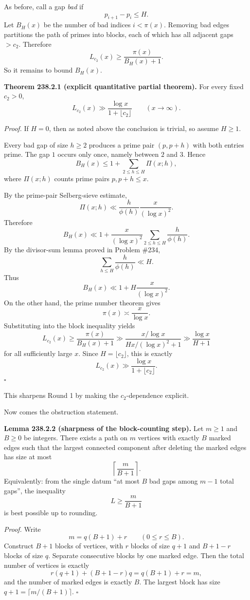 As before, call a gap \emph{bad} if
\[
p_{i+1}-p_i\le H.
\]
Let $B_H(x)$ be the number of bad indices $i<\pi(x)$. Removing bad edges partitions the path of primes into blocks, each of which has all adjacent gaps $>c_2$. Therefore
\[
L_{c_2}(x)\ge \frac{\pi(x)}{B_H(x)+1}.
\]
So it remains to bound $B_H(x)$.

\medskip
\noindent
\textbf{Theorem 238.2.1 (explicit quantitative partial theorem).}
For every fixed $c_2>0$,
\[
L_{c_2}(x)\gg \frac{\log x}{1+\lfloor c_2\rfloor}
\qquad (x\to\infty).
\]

\emph{Proof.}
If $H=0$, then as noted above the conclusion is trivial, so assume $H\ge 1$.

Every bad gap of size $h\ge 2$ produces a prime pair $(p,p+h)$ with both entries prime. The gap $1$ occurs only once, namely between $2$ and $3$. Hence
\[
B_H(x)
\le
1+\sum_{2\le h\le H}\Pi(x;h),
\]
where $\Pi(x;h)$ counts prime pairs $p,p+h\le x$.

By the prime-pair Selberg-sieve estimate,
\[
\Pi(x;h)\ll \frac{h}{\phi(h)}\frac{x}{(\log x)^2}.
\]
Therefore
\[
B_H(x)
\ll
1+\frac{x}{(\log x)^2}\sum_{2\le h\le H}\frac{h}{\phi(h)}.
\]
By the divisor-sum lemma proved in Problem \#234,
\[
\sum_{h\le H}\frac{h}{\phi(h)}\ll H.
\]
Thus
\[
B_H(x)\ll 1+H\frac{x}{(\log x)^2}.
\]
On the other hand, the prime number theorem gives
\[
\pi(x)\asymp \frac{x}{\log x}.
\]
Substituting into the block inequality yields
\[
L_{c_2}(x)
\ge
\frac{\pi(x)}{B_H(x)+1}
\gg
\frac{x/\log x}{H x/(\log x)^2+1}
\gg
\frac{\log x}{H+1}
\]
for all sufficiently large $x$. Since $H=\lfloor c_2\rfloor$, this is exactly
\[
L_{c_2}(x)\gg \frac{\log x}{1+\lfloor c_2\rfloor}.
\]
\hfill$\square$
\medskip

This sharpens Round 1 by making the $c_2$-dependence explicit.

Now comes the obstruction statement.

\medskip
\noindent
\textbf{Lemma 238.2.2 (sharpness of the block-counting step).}
Let $m\ge 1$ and $B\ge 0$ be integers. There exists a path on $m$ vertices with exactly $B$ marked edges such that the largest connected component after deleting the marked edges has size at most
\[
\left\lceil \frac{m}{B+1}\right\rceil.
\]
Equivalently: from the single datum ``at most $B$ bad gaps among $m-1$ total gaps'', the inequality
\[
L\ge \frac{m}{B+1}
\]
is best possible up to rounding.

\emph{Proof.}
Write
\[
m=q(B+1)+r
\qquad (0\le r\le B).
\]
Construct $B+1$ blocks of vertices, with $r$ blocks of size $q+1$ and $B+1-r$ blocks of size $q$. Separate consecutive blocks by one marked edge. Then the total number of vertices is exactly
\[
r(q+1)+(B+1-r)q = q(B+1)+r = m,
\]
and the number of marked edges is exactly $B$. The largest block has size $q+1=\lceil m/(B+1)\rceil$.
\hfill$\square$
\medskip

